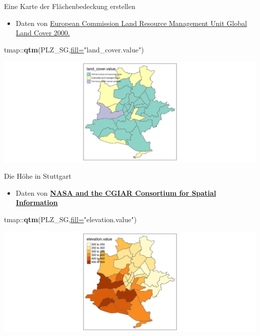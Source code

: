\documentclass[ignorenonframetext,]{beamer}
\newenvironment{Shaded}{\begin{snugshade}}{\end{snugshade}}
\newcommand{\DataTypeTok}[1]{\textcolor[rgb]{0.74,0.68,0.62}{\underline{#1}}}
\newcommand{\KeywordTok}[1]{\textcolor[rgb]{0.26,0.66,0.93}{\textbf{#1}}}
\newcommand{\NormalTok}[1]{\textcolor[rgb]{0.74,0.68,0.62}{#1}}
\newcommand{\OperatorTok}[1]{\textcolor[rgb]{0.74,0.68,0.62}{#1}}
\newcommand{\StringTok}[1]{\textcolor[rgb]{0.02,0.61,0.04}{#1}}
\providecommand{\tightlist}{%
  \setlength{\itemsep}{0pt}\setlength{\parskip}{0pt}}
\begin{document}
\begin{frame}[fragile]{Eine Karte der Flächenbedeckung erstellen}
\protect\hypertarget{eine-karte-der-flachenbedeckung-erstellen}{}

\begin{itemize}
\tightlist
\item
  Daten von
  \href{http://bioval.jrc.ec.europa.eu/products/glc2000/products.php}{European
  Commission Land Resource Management Unit Global Land Cover 2000.}
\end{itemize}

\begin{Shaded}
\begin{Highlighting}[]
\NormalTok{tmap}\OperatorTok{::}\KeywordTok{qtm}\NormalTok{(PLZ_SG,}\DataTypeTok{fill=}\StringTok{"land_cover.value"}\NormalTok{)}
\end{Highlighting}
\end{Shaded}

\includegraphics{B4_Overpass_files/figure-beamer/unnamed-chunk-27-1.pdf}

\end{frame}

\begin{frame}[fragile]{Die Höhe in Stuttgart}
\protect\hypertarget{die-hohe-in-stuttgart}{}

\begin{itemize}
\tightlist
\item
  Daten von \href{http://srtm.csi.cgiar.org/}{\textbf{NASA and the CGIAR
  Consortium for Spatial Information }}
\end{itemize}

\begin{Shaded}
\begin{Highlighting}[]
\NormalTok{tmap}\OperatorTok{::}\KeywordTok{qtm}\NormalTok{(PLZ_SG,}\DataTypeTok{fill=}\StringTok{"elevation.value"}\NormalTok{)}
\end{Highlighting}
\end{Shaded}

\includegraphics{B4_Overpass_files/figure-beamer/unnamed-chunk-28-1.pdf}

\end{frame}
\end{document}
